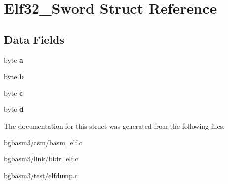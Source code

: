 \hypertarget{structElf32__Sword}{\section{Elf32\-\_\-\-Sword Struct Reference}
\label{structElf32__Sword}
}
\subsection*{Data Fields}
\begin{DoxyCompactItemize}
\item 
\hypertarget{structElf32__Sword_a47f1e3ee624ffa2ea32495ea5921af2e}{byte {\bfseries a}}\label{structElf32__Sword_a47f1e3ee624ffa2ea32495ea5921af2e}

\item 
\hypertarget{structElf32__Sword_acd14840ebdb3421e79a7a9b81473fa0e}{byte {\bfseries b}}\label{structElf32__Sword_acd14840ebdb3421e79a7a9b81473fa0e}

\item 
\hypertarget{structElf32__Sword_acdd8bbe52add66491943cfe0c1b77c65}{byte {\bfseries c}}\label{structElf32__Sword_acdd8bbe52add66491943cfe0c1b77c65}

\item 
\hypertarget{structElf32__Sword_a0ac4fc4c130970231d51ab3342324740}{byte {\bfseries d}}\label{structElf32__Sword_a0ac4fc4c130970231d51ab3342324740}

\end{DoxyCompactItemize}


The documentation for this struct was generated from the following files\-:\begin{DoxyCompactItemize}
\item 
bgbasm3/asm/basm\-\_\-elf.\-c\item 
bgbasm3/link/bldr\-\_\-elf.\-c\item 
bgbasm3/test/elfdump.\-c\end{DoxyCompactItemize}

